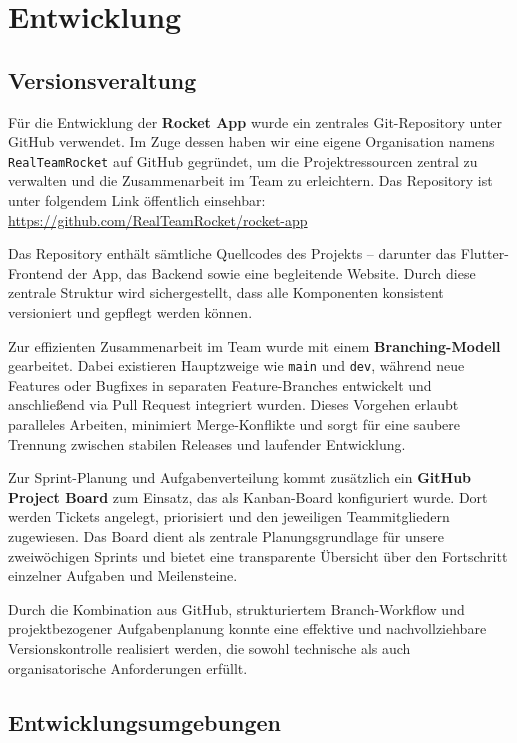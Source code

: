 \documentclass[11pt,a4paper]{article}
\begin{document}
\section{Entwicklung}
\subsection{Versionsveraltung}
Für die Entwicklung der \textbf{Rocket App} wurde ein zentrales Git-Repository unter GitHub verwendet. Im Zuge dessen haben wir eine eigene Organisation namens \texttt{RealTeamRocket} auf GitHub gegründet, um die Projektressourcen zentral zu verwalten und die Zusammenarbeit im Team zu erleichtern. Das Repository ist unter folgendem Link öffentlich einsehbar:
\url{https://github.com/RealTeamRocket/rocket-app}

Das Repository enthält sämtliche Quellcodes des Projekts – darunter das Flutter-Frontend der App, das Backend sowie eine begleitende Website. Durch diese zentrale Struktur wird sichergestellt, dass alle Komponenten konsistent versioniert und gepflegt werden können.

Zur effizienten Zusammenarbeit im Team wurde mit einem \textbf{Branching-Modell} gearbeitet. Dabei existieren Hauptzweige wie \texttt{main} und \texttt{dev}, während neue Features oder Bugfixes in separaten Feature-Branches entwickelt und anschließend via Pull Request integriert wurden. Dieses Vorgehen erlaubt paralleles Arbeiten, minimiert Merge-Konflikte und sorgt für eine saubere Trennung zwischen stabilen Releases und laufender Entwicklung.

Zur Sprint-Planung und Aufgabenverteilung kommt zusätzlich ein \textbf{GitHub Project Board} zum Einsatz, das als Kanban-Board konfiguriert wurde. Dort werden Tickets angelegt, priorisiert und den jeweiligen Teammitgliedern zugewiesen. Das Board dient als zentrale Planungsgrundlage für unsere zweiwöchigen Sprints und bietet eine transparente Übersicht über den Fortschritt einzelner Aufgaben und Meilensteine.

Durch die Kombination aus GitHub, strukturiertem Branch-Workflow und projektbezogener Aufgabenplanung konnte eine effektive und nachvollziehbare Versionskontrolle realisiert werden, die sowohl technische als auch organisatorische Anforderungen erfüllt.

\subsection{Entwicklungsumgebungen}
\end{document}
